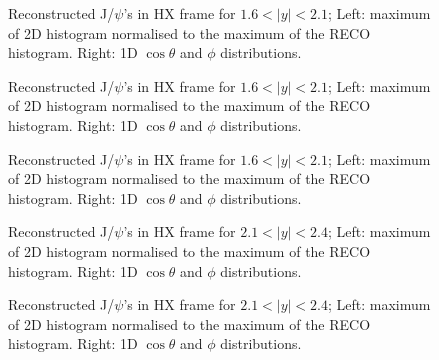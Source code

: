 \documentclass[12pt]{article}
\newcommand{\jpsi}{J/$\psi$}
\begin{document}
\begin{figure}[htbp]
\centering
{}
\caption{Reconstructed \jpsi's in HX frame for $1.6 < |y| < 2.1$; Left: maximum of 2D histogram normalised to the maximum of the RECO histogram. Right: 1D $\cos\theta$ and $\phi$ distributions.}
\label{fig:trackerMuonsVsEta}
\end{figure} \clearpage 

\begin{figure}[htbp]
\centering
{}
\caption{Reconstructed \jpsi's in HX frame for $1.6 < |y| < 2.1$; Left: maximum of 2D histogram normalised to the maximum of the RECO histogram. Right: 1D $\cos\theta$ and $\phi$ distributions.}
\label{fig:trackerMuonsVsEta}
\end{figure} \clearpage 

\begin{figure}[htbp]
\centering
{}
\caption{Reconstructed \jpsi's in HX frame for $1.6 < |y| < 2.1$; Left: maximum of 2D histogram normalised to the maximum of the RECO histogram. Right: 1D $\cos\theta$ and $\phi$ distributions.}
\label{fig:trackerMuonsVsEta}
\end{figure} \clearpage 


\begin{figure}[htbp]
\centering
{}
\caption{Reconstructed \jpsi's in HX frame for $2.1 < |y| < 2.4$; Left: maximum of 2D histogram normalised to the maximum of the RECO histogram. Right: 1D $\cos\theta$ and $\phi$ distributions.}
\label{fig:trackerMuonsVsEta}
\end{figure} \clearpage 

\begin{figure}[htbp]
\centering
{}
\caption{Reconstructed \jpsi's in HX frame for $2.1 < |y| < 2.4$; Left: maximum of 2D histogram normalised to the maximum of the RECO histogram. Right: 1D $\cos\theta$ and $\phi$ distributions.}
\label{fig:trackerMuonsVsEta}
\end{figure} \clearpage 
\end{document}
